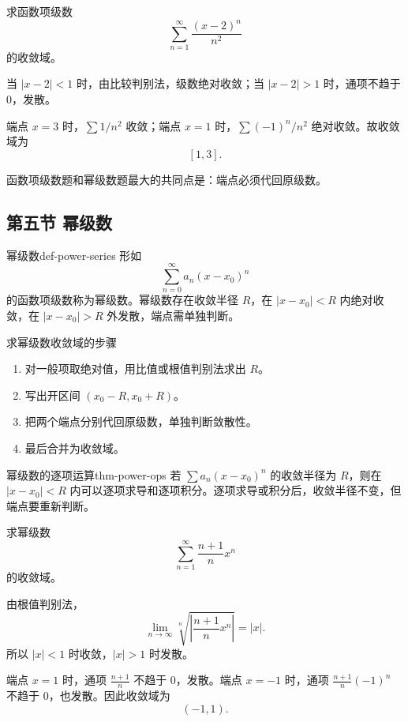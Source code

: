 \begin{problem}
求函数项级数
\[
  \sum_{n=1}^{\infty}\frac{(x-2)^n}{n^2}
\]
的收敛域。
\end{problem}
\begin{solution}
当 $|x-2|<1$ 时，由比较判别法，级数绝对收敛；当 $|x-2|>1$ 时，通项不趋于 $0$，发散。

端点 $x=3$ 时，$\sum1/n^2$ 收敛；端点 $x=1$ 时，$\sum(-1)^n/n^2$ 绝对收敛。故收敛域为
\[
  [1,3].
\]
\end{solution}
\begin{note}
函数项级数题和幂级数题最大的共同点是：端点必须代回原级数。
\end{note}

\subsection{第五节 幂级数}

\begin{dy}{幂级数}{def-power-series}
形如
\[
  \sum_{n=0}^{\infty}a_n(x-x_0)^n
\]
的函数项级数称为幂级数。幂级数存在收敛半径 $R$，在 $|x-x_0|<R$ 内绝对收敛，在 $|x-x_0|>R$ 外发散，端点需单独判断。
\end{dy}

\begin{methodbox}{求幂级数收敛域的步骤}
\begin{enumerate}
  \item 对一般项取绝对值，用比值或根值判别法求出 $R$。
  \item 写出开区间 $(x_0-R,x_0+R)$。
  \item 把两个端点分别代回原级数，单独判断敛散性。
  \item 最后合并为收敛域。
\end{enumerate}
\end{methodbox}

\begin{dl}{幂级数的逐项运算}{thm-power-ops}
若 $\sum a_n(x-x_0)^n$ 的收敛半径为 $R$，则在 $|x-x_0|<R$ 内可以逐项求导和逐项积分。逐项求导或积分后，收敛半径不变，但端点要重新判断。
\end{dl}

\begin{problem}
求幂级数
\[
  \sum_{n=1}^{\infty}\frac{n+1}{n}x^n
\]
的收敛域。
\end{problem}
\begin{solution}
由根值判别法，
\[
  \lim_{n\to\infty}\sqrt[n]{\left|\frac{n+1}{n}x^n\right|}=|x|.
\]
所以 $|x|<1$ 时收敛，$|x|>1$ 时发散。

端点 $x=1$ 时，通项 $\frac{n+1}{n}$ 不趋于 $0$，发散。端点 $x=-1$ 时，通项 $\frac{n+1}{n}(-1)^n$ 不趋于 $0$，也发散。因此收敛域为
\[
  (-1,1).
\]
\end{solution}

